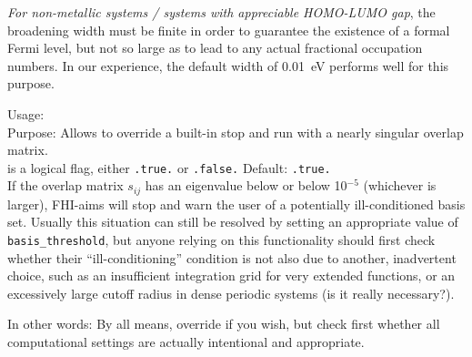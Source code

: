\emph{For non-metallic systems / systems with appreciable HOMO-LUMO
gap}, the broadening width must be finite in order to guarantee the
existence of a formal Fermi level, but not so large as to lead to any
actual fractional occupation numbers. In our experience, the default
width of 0.01~eV performs well for this purpose.

{
  \noindent
  Usage:   \\[1.0ex]
  Purpose: Allows to override a built-in stop and run with a nearly singular
  overlap matrix. \\[1.0ex]
   is a logical flag, either \texttt{.true.} or \texttt{.false.}
  Default: \texttt{.true.} \\ 
}
If the overlap matrix $s_{ij}$ has an eigenvalue below
   or below 10$^{-5}$ (whichever is larger),
  FHI-aims will stop and warn the user of a potentially ill-conditioned basis
  set. Usually this situation can still be resolved by setting an appropriate
  value of \texttt{basis\_threshold}, but anyone relying on this functionality
  should first check whether their ``ill-conditioning'' condition is not also
  due to another, inadvertent choice, such as an insufficient integration grid
  for very extended functions, or an excessively large cutoff radius in dense
  periodic systems (is it really necessary?). 

In other words: By all means, override if you wish, but check first whether
  all computational settings are actually intentional and appropriate. 
